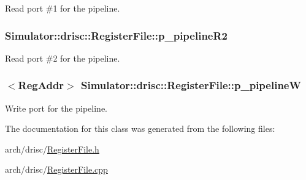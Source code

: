 Read port \#1 for the pipeline. 

\hypertarget{class_simulator_1_1drisc_1_1_register_file_afd0962c8b4612df006247a1c6003a80f}{
\subsubsection[{p\+\_\+pipeline\+R2}]{ Simulator\+::drisc\+::\+Register\+File\+::p\+\_\+pipeline\+R2}}\label{class_simulator_1_1drisc_1_1_register_file_afd0962c8b4612df006247a1c6003a80f}


Read port \#2 for the pipeline. 

\hypertarget{class_simulator_1_1drisc_1_1_register_file_a590c9d875284b49a33f44dec3c99422e}{
\subsubsection[{p\+\_\+pipeline\+W}]{$<${\bf Reg\+Addr}$>$ Simulator\+::drisc\+::\+Register\+File\+::p\+\_\+pipeline\+W}}\label{class_simulator_1_1drisc_1_1_register_file_a590c9d875284b49a33f44dec3c99422e}


Write port for the pipeline. 



The documentation for this class was generated from the following files\+:\begin{DoxyCompactItemize}
\item 
arch/drisc/\hyperlink{_register_file_8h}{Register\+File.\+h}\item 
arch/drisc/\hyperlink{_register_file_8cpp}{Register\+File.\+cpp}\end{DoxyCompactItemize}
